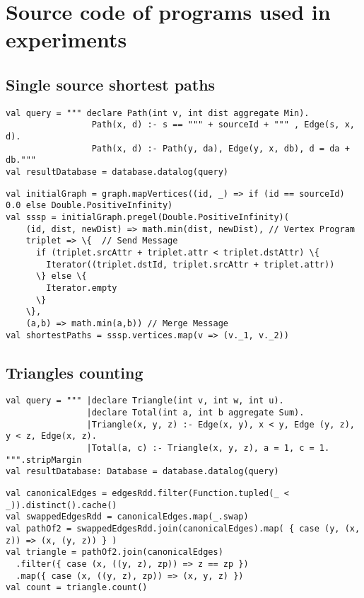 \chapter{Source code of programs used in experiments}\label{appendixa}

\section{Single source shortest paths}
\begin{Verbatim}[label=Shortest paths - SparkDatalog]
val query = """ declare Path(int v, int dist aggregate Min).
                 Path(x, d) :- s == """ + sourceId + """ , Edge(s, x, d).
                 Path(x, d) :- Path(y, da), Edge(y, x, db), d = da + db."""
val resultDatabase = database.datalog(query)
\end{Verbatim}

\vspace{0cm}

\begin{Verbatim}[label=Shortest paths - Spark]
val initialGraph = graph.mapVertices((id, _) => if (id == sourceId) 0.0 else Double.PositiveInfinity)
val sssp = initialGraph.pregel(Double.PositiveInfinity)(
    (id, dist, newDist) => math.min(dist, newDist), // Vertex Program
    triplet => \{  // Send Message
      if (triplet.srcAttr + triplet.attr < triplet.dstAttr) \{
        Iterator((triplet.dstId, triplet.srcAttr + triplet.attr))
      \} else \{
        Iterator.empty
      \}
    \},
    (a,b) => math.min(a,b)) // Merge Message
val shortestPaths = sssp.vertices.map(v => (v._1, v._2))
\end{Verbatim}


\section{Triangles counting}
\begin{Verbatim}[label=Triangles counting - SparkDatalog]
val query = """ |declare Triangle(int v, int w, int u).
                |declare Total(int a, int b aggregate Sum).
                |Triangle(x, y, z) :- Edge(x, y), x < y, Edge (y, z), y < z, Edge(x, z).
                |Total(a, c) :- Triangle(x, y, z), a = 1, c = 1. """.stripMargin
val resultDatabase: Database = database.datalog(query)
\end{Verbatim}

\vspace{0cm}

\begin{Verbatim}[label=Triangles counting - Spark]
val canonicalEdges = edgesRdd.filter(Function.tupled(_ < _)).distinct().cache()
val swappedEdgesRdd = canonicalEdges.map(_.swap)
val pathOf2 = swappedEdgesRdd.join(canonicalEdges).map( { case (y, (x, z)) => (x, (y, z)) } )
val triangle = pathOf2.join(canonicalEdges)
  .filter({ case (x, ((y, z), zp)) => z == zp })
  .map({ case (x, ((y, z), zp)) => (x, y, z) })
val count = triangle.count()
\end{Verbatim}


